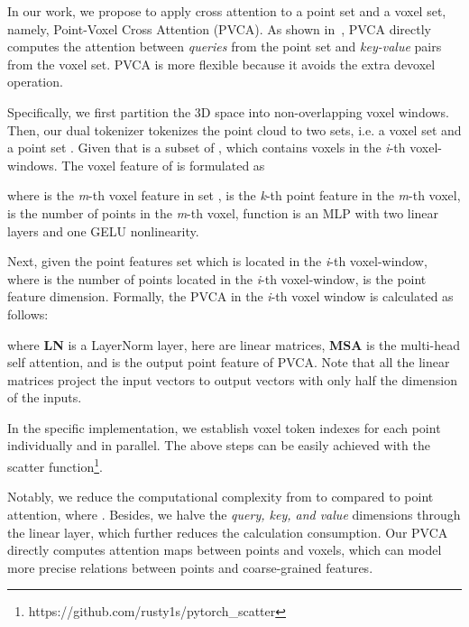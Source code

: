 \documentclass[10pt,twocolumn,letterpaper]{article}
\begin{document}
In our work, we propose to apply cross attention to a point set and a voxel set, namely, Point-Voxel Cross Attention (PVCA). As shown in~, PVCA directly computes the attention between \textit{queries} from the point set and \textit{key-value} pairs from the voxel set. PVCA is more flexible because it avoids the extra devoxel operation.



Specifically, we first partition the 3D space into non-overlapping voxel windows. Then, our dual tokenizer tokenizes the point cloud to two sets, i.e. a voxel set  and a point set . Given that  is a subset of , which contains voxels in the \textit{i}-th voxel-windows. The voxel feature of  is formulated as




where  is the \textit{m}-th voxel feature in set ,  is the \textit{k}-th point feature in the \textit{m}-th voxel,  is the number of points in the \textit{m}-th voxel, function  is an MLP with two linear layers and one GELU nonlinearity.

Next, given the point features set  which is located in the \textit{i}-th voxel-window, where  is the number of points located in the \textit{i}-th voxel-window,  is the point feature dimension. Formally, the PVCA in the \textit{i}-th voxel window is calculated as follows:


where \textbf{LN} is a LayerNorm layer,  here are linear matrices, \textbf{MSA} is the multi-head self attention, and  is the output point feature of PVCA. Note that all the linear matrices  project the input vectors to output vectors with only half the dimension of the inputs.

In the specific implementation, we establish voxel token indexes for each point individually and in parallel. The above steps can be easily achieved with the scatter function\footnote{https://github.com/rusty1s/pytorch\_scatter}. 


Notably, we reduce the computational complexity from  to  compared to point attention, where . Besides, we halve the \textit{query, key, and value} dimensions through the linear layer, which further reduces the calculation consumption. Our PVCA directly computes attention maps between points and voxels, which can model more precise relations between points and coarse-grained features. 
\end{document}
